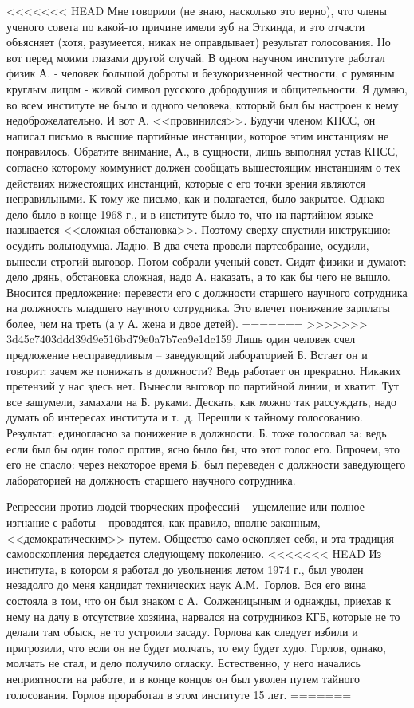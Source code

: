\documentclass{book}
\begin{document}
<<<<<<< HEAD
Мне говорили (не знаю, насколько это верно), что члены ученого совета по какой‑то причине имели зуб на Эткинда, и это отчасти объясняет (хотя, разумеется, никак не оправды­вает) результат голосования. Но вот перед моими глазами другой случай. В одном научном институте работал физик А. ‑ человек большой доброты и безукоризненной честности, с ру­мяным круглым лицом ‑ живой символ русского доброду­шия и общительности. Я думаю, во всем институте не было и одного человека, который был бы настроен к нему недобро­желательно. И вот А. <<провинился>>. Будучи членом КПСС, он написал письмо в высшие партийные инстанции, которое этим инстанциям не понравилось. Обратите внимание, А., в сущ­ности, лишь выполнял устав КПСС, согласно которому комму­нист должен сообщать вышестоящим инстанциям о тех дейст­виях нижестоящих инстанций, которые с его точки зрения являются неправильными. К тому же письмо, как и полагает­ся, было закрытое. Однако дело было в конце 1968 г., и в институте было то, что на партийном языке называется <<слож­ная обстановка>>. Поэтому сверху спустили инструкцию: осу­дить вольнодумца. Ладно. В два счета провели партсобрание, осудили, вынесли строгий выговор. Потом собрали ученый со­вет. Сидят физики и думают: дело дрянь, обстановка сложная, надо А. наказать, а то как бы чего не вышло. Вносится предло­жение: перевести его с должности старшего научного сотруд­ника на должность младшего научного сотрудника. Это вле­чет понижение зарплаты более, чем на треть (а у А. жена и двое детей).
=======
>>>>>>> 3d45c7403ddd39d9e516bd79e0a7b7ca9e1dc159
Лишь один человек счел предложение несправедливым -- заведующий лабораторией Б. Встает он и говорит: зачем же понижать в должности? Ведь работает он прекрасно. Никаких претензий у нас здесь нет. Вынесли выговор по партийной линии, и хватит.
Тут все зашумели, замахали на Б. руками. Дескать, как можно так рассуждать, надо думать об интересах института и т.~д. Перешли к тайному голосованию. Результат: единогласно за понижение в должности. Б. тоже голосовал за:  ведь если был бы один голос против, ясно было бы, что этот голос его. Впрочем, это его не спасло: через некоторое время Б. был переведен с должности заведующего лабораторией на должность старшего научного сотрудника.

Репрессии против людей творческих профессий -- ущемление или полное изгнание с работы -- проводятся, как правило, вполне законным, <<демократическим>> путем. Общество само оскопляет себя, и эта традиция самооскопления передается следующему поколению.
<<<<<<< HEAD
Из института, в котором я работал до увольнения летом 1974 г., был уволен незадолго до меня кандидат технических наук А.М.~Горлов. Вся его вина состояла в том, что он был знаком с А.~Солженицыным и однажды, приехав к нему на дачу в отсутствие хозяина, нарвался на сотрудников КГБ, которые не то делали там обыск, не то устроили засаду. Горлова как следует избили и пригрозили, что если он не будет молчать, то ему будет худо. Горлов, однако, молчать не стал, и дело получило огласку. Естественно, у него начались неприятности на работе, и в конце концов он был уволен путем тайного голосования. Горлов проработал в этом институте 15 лет.
=======
\end{document}
